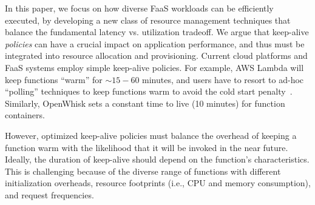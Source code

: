 \begin{comment}
In this paper, we explore this tradeoff, and argue for and develop principled keep-alive techniques. 
%
Current cloud platforms and FaaS systems employ simple keep-alive policies. 
%
For example, AWS Lambda will keep functions ``warm'' for $\sim 15-60$ minutes, and users have to resort to wasteful ``polling'' techniques to keep functions warm to avoid the cold start penalty~\cite{lambda-warm, lambda-limits, lambda-warm-hour}. 
% 
An optimized keep-alive policy must balance the overhead of keeping a function warm with the likelihood that the function will be called again in the near future, and the duration of keep-alive should depend on the function's characteristics. 
%
Designing keep-alive policies is challenging because of the diverse range of functions with different initialization overheads, resource footprints (i.e., CPU and memory consumption),  and request frequencies. 
%
\end{comment}


%
In this paper, we focus on how diverse FaaS workloads can be efficiently executed, by developing a new class of resource management techniques that balance the fundamental latency vs. utilization tradeoff.
We argue that keep-alive \emph{policies} can have a crucial impact on application performance, and thus must be integrated into resource allocation and provisioning. %
Current cloud platforms and FaaS systems employ simple keep-alive policies. 
For example, AWS Lambda will keep functions ``warm'' for $\sim 15-60$ minutes, and users have to resort to ad-hoc ``polling'' techniques to keep functions warm to avoid the cold start penalty~\cite{lambda-warm, lambda-limits, lambda-warm-hour}.
Similarly, OpenWhisk sets a constant time to live (10 minutes) for function containers.


However, optimized keep-alive policies must balance the overhead of keeping a function warm with the likelihood that it will be invoked in the near future. 
Ideally, the duration of keep-alive should depend on the function's characteristics. 
This is challenging because of the diverse range of functions with different initialization overheads, resource footprints (i.e., CPU and memory consumption),  and request frequencies. 


